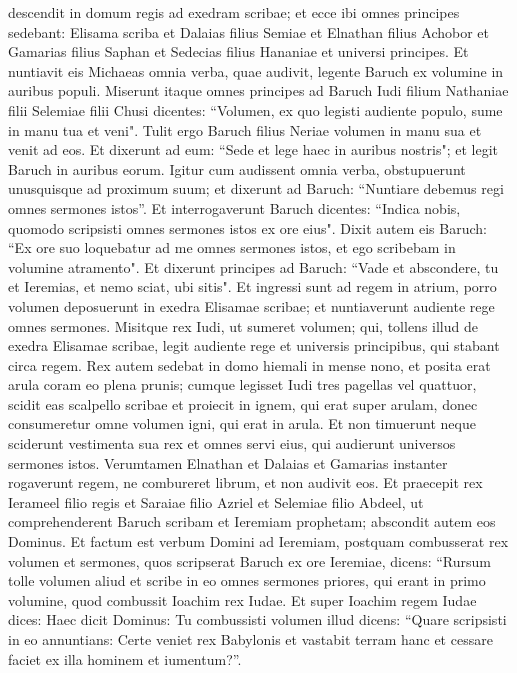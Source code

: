 \begin{biblechapter}
\verse descendit in domum regis ad exedram scribae; et ecce ibi omnes principes sedebant: Elisama scriba et Dalaias filius Semiae et Elnathan filius Achobor et Gamarias filius Saphan et Sedecias filius Hananiae et universi principes. 
\verse Et nuntiavit eis Michaeas omnia verba, quae audivit, legente Baruch ex volumine in auribus populi. 
\verse Miserunt itaque omnes principes ad Baruch Iudi filium Nathaniae filii Selemiae filii Chusi dicentes: “Volumen, ex quo legisti audiente populo, sume in manu tua et veni". Tulit ergo Baruch filius Neriae volumen in manu sua et venit ad eos. 
\verse Et dixerunt ad eum: “Sede et lege haec in auribus nostris"; et legit Baruch in auribus eorum. 
\verse Igitur cum audissent omnia verba, obstupuerunt unusquisque ad proximum suum; et dixerunt ad Baruch: “Nuntiare debemus regi omnes sermones istos”. 
\verse Et interrogaverunt Baruch dicentes: “Indica nobis, quomodo scripsisti omnes sermones istos ex ore eius". 
\verse Dixit autem eis Baruch: “Ex ore suo loquebatur ad me omnes sermones istos, et ego scribebam in volumine atramento".  
\verse Et dixerunt principes ad Baruch: “Vade et abscondere, tu et Ieremias, et nemo sciat, ubi sitis". 
\verse Et ingressi sunt ad regem in atrium, porro volumen deposuerunt in exedra Elisamae scribae; et nuntiaverunt audiente rege omnes sermones. 
\verse Misitque rex Iudi, ut sumeret volumen; qui, tollens illud de exedra Elisamae scribae, legit audiente rege et universis principibus, qui stabant circa regem. 
\verse Rex autem sedebat in domo hiemali in mense nono, et posita erat arula coram eo plena prunis; 
\verse cumque legisset Iudi tres pagellas vel quattuor, scidit eas scalpello scribae et proiecit in ignem, qui erat super arulam, donec consumeretur omne volumen igni, qui erat in arula. 
\verse Et non timuerunt neque sciderunt vestimenta sua rex et omnes servi eius, qui audierunt universos sermones istos. 
\verse Verumtamen Elnathan et Dalaias et Gamarias instanter rogaverunt regem, ne combureret librum, et non audivit eos. 
\verse Et praecepit rex Ierameel filio regis et Saraiae filio Azriel et Selemiae filio Abdeel, ut comprehenderent Baruch scribam et Ieremiam prophetam; abscondit autem eos Dominus. 
\verse Et factum est verbum Domini ad Ieremiam, postquam combusserat rex volumen et sermones, quos scripserat Baruch ex ore Ieremiae, dicens: 
\verse “Rursum tolle volumen aliud et scribe in eo omnes sermones priores, qui erant in primo volumine, quod combussit Ioachim rex Iudae. 
\verse Et super Ioachim regem Iudae dices: Haec dicit Dominus: Tu combussisti volumen illud dicens: “Quare scripsisti in eo annuntians: Certe veniet rex Babylonis et vastabit terram hanc et cessare faciet ex illa hominem et iumentum?”. 

\end{biblechapter}
